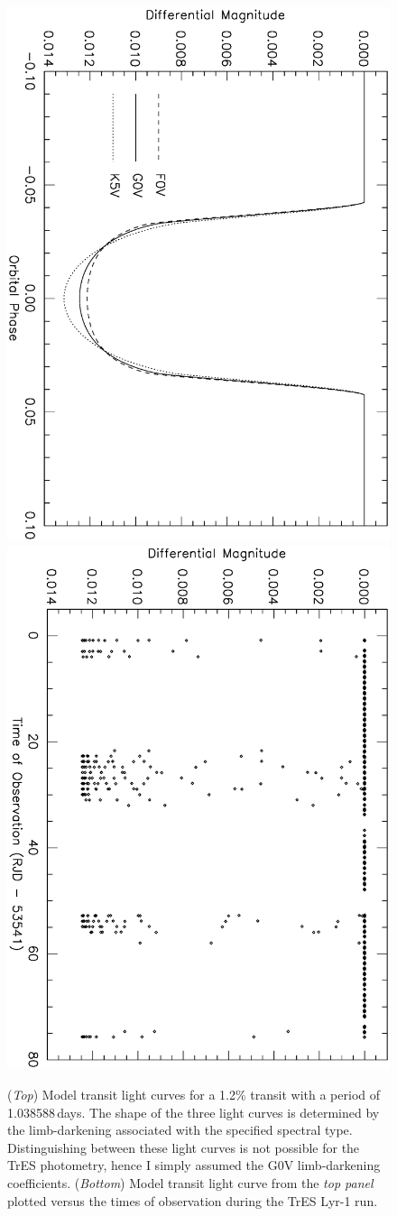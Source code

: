\begin{figure}
\begin{center}
\centering
\includegraphics[width=.55\textwidth, angle=90]{7_agol_a}\\
\includegraphics[width=.55\textwidth, angle=90]{7_agol_b}\\
\caption[Example of model transits]{%
({\it Top}) %
Model transit light curves for a 1.2\% transit with a period of 1.038588\,days.
The shape of the three light curves is determined by the limb-darkening associated with the specified spectral type.
Distinguishing between these light curves is not possible for the TrES photometry, hence I simply assumed the G0V limb-darkening coefficients.
({\it Bottom}) Model transit light curve from the {\it top panel} plotted versus the times of observation during the TrES Lyr-1 run. %
}%
\label{cha:human:sec:model:fig:agol}%
\end{center}
\end{figure}

